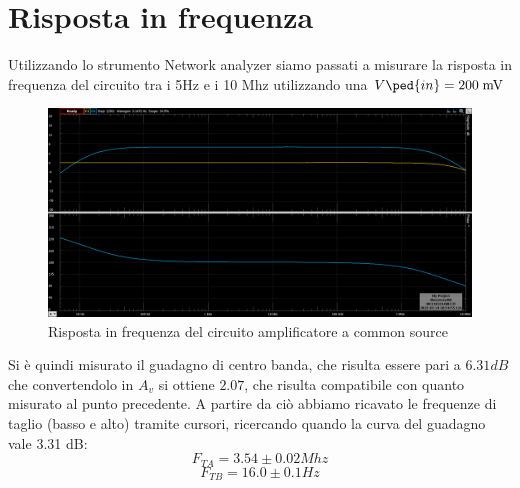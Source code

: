 \documentclass[10pt, a4paper, italian]{article}
\begin{document}
\section{Risposta in frequenza}
Utilizzando lo strumento Network analyzer siamo passati a misurare la risposta in frequenza del circuito tra i 5Hz e i 10 Mhz utilizzando una $V\ped{in}=200 \; \si{m\V}$\\
\begin{figure}[htbp]
    \centering
	\includegraphics[scale=0.4]{network}
    \caption{Risposta in frequenza del circuito amplificatore a common source}
\end{figure}
Si è quindi misurato il guadagno di centro banda, che risulta essere pari a $6.31 dB$ che convertendolo in $A_v$ si ottiene $2.07$, che risulta compatibile con quanto misurato al punto precedente.
A partire da ciò abbiamo ricavato le frequenze di taglio (basso e alto) tramite cursori, ricercando quando la curva del guadagno vale 3.31 dB:
\[
F_{TA}=3.54 \pm 0.02Mhz
\]
\[
F_{TB}= 16.0 \pm 0.1Hz
\]
\end{document}
